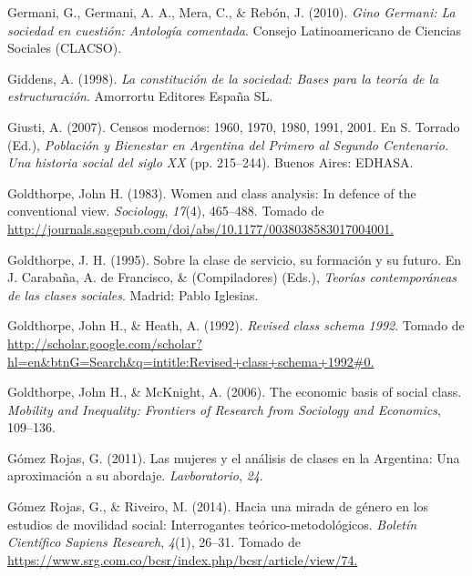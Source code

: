 \documentclass[
]{article}
\newlength{\cslhangindent}
\newlength{\cslentryspacingunit} %
\newenvironment{CSLReferences}[2] %
 {%
  \setlength{\parindent}{0pt}
  \ifodd #1
  \let\oldpar\par
  \def\par{\hangindent=\cslhangindent\oldpar}
  \fi
  \setlength{\parskip}{#2\cslentryspacingunit}
 }%
 {}
\begin{document}
\begin{CSLReferences}{1}{0}
\leavevmode{}%
Germani, G., Germani, A. A., Mera, C., \& Rebón, J. (2010). \emph{Gino {Germani}: La sociedad en cuestión: Antología comentada}. Consejo Latinoamericano de Ciencias Sociales (CLACSO).

\leavevmode{}%
Giddens, A. (1998). \emph{La constitución de la sociedad: Bases para la teoría de la estructuración}. Amorrortu Editores España SL.

\leavevmode{}%
Giusti, A. (2007). Censos modernos: 1960, 1970, 1980, 1991, 2001. En S. Torrado (Ed.), \emph{Población y {Bienestar} en {Argentina} del {Primero} al {Segundo} {Centenario}. {Una} historia social del siglo {XX}} (pp. 215--244). Buenos Aires: EDHASA.

\leavevmode{}%
Goldthorpe, John H. (1983). Women and class analysis: In defence of the conventional view. \emph{Sociology}, \emph{17}(4), 465--488. Tomado de \href{http://journals.sagepub.com/doi/abs/10.1177/0038038583017004001}{http://journals.sagepub.com/doi/abs/10.1177/0038038583017004001.}

\leavevmode{}%
Goldthorpe, J. H. (1995). Sobre la clase de servicio, su formación y su futuro. En J. Carabaña, A. de Francisco, \& (Compiladores) (Eds.), \emph{Teorías contemporáneas de las clases sociales}. Madrid: Pablo Iglesias.

\leavevmode{}%
Goldthorpe, John H., \& Heath, A. (1992). \emph{Revised class schema 1992}. Tomado de \href{http://scholar.google.com/scholar?hl=en\&btnG=Search\&q=intitle:Revised+class+schema+1992\#0}{http://scholar.google.com/scholar?hl=en\&btnG=Search\&q=intitle:Revised+class+schema+1992\#0.}

\leavevmode{}%
Goldthorpe, John H., \& McKnight, A. (2006). The economic basis of social class. \emph{Mobility and Inequality: Frontiers of Research from Sociology and Economics}, 109--136.

\leavevmode{}%
Gómez Rojas, G. (2011). Las mujeres y el análisis de clases en la {Argentina}: Una aproximación a su abordaje. \emph{Lavboratorio}, \emph{24}.

\leavevmode{}%
Gómez Rojas, G., \& Riveiro, M. (2014). Hacia una mirada de género en los estudios de movilidad social: Interrogantes teórico-metodológicos. \emph{Boletín Científico Sapiens Research}, \emph{4}(1), 26--31. Tomado de \href{https://www.srg.com.co/bcsr/index.php/bcsr/article/view/74}{https://www.srg.com.co/bcsr/index.php/bcsr/article/view/74.}


\end{CSLReferences}
\end{document}
